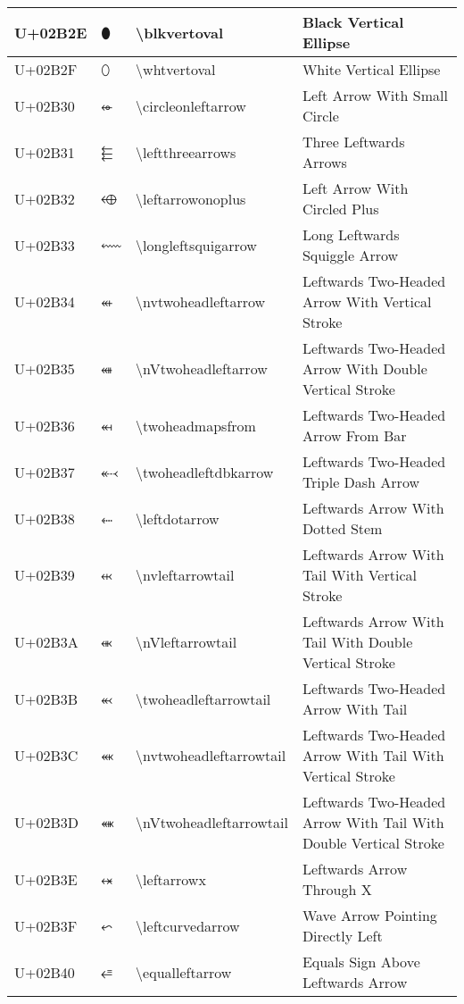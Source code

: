 \begin{table}[h]
\begin{tabulary}{\linewidth}{|L|L|L|L|}
\hline
U+02B2E & ⬮ & {\textbackslash}blkvertoval & Black Vertical Ellipse \\
\hline
U+02B2F & ⬯ & {\textbackslash}whtvertoval & White Vertical Ellipse \\
\hline
U+02B30 & ⬰ & {\textbackslash}circleonleftarrow & Left Arrow With Small Circle \\
\hline
U+02B31 & ⬱ & {\textbackslash}leftthreearrows & Three Leftwards Arrows \\
\hline
U+02B32 & ⬲ & {\textbackslash}leftarrowonoplus & Left Arrow With Circled Plus \\
\hline
U+02B33 & ⬳ & {\textbackslash}longleftsquigarrow & Long Leftwards Squiggle Arrow \\
\hline
U+02B34 & ⬴ & {\textbackslash}nvtwoheadleftarrow & Leftwards Two-Headed Arrow With Vertical Stroke \\
\hline
U+02B35 & ⬵ & {\textbackslash}nVtwoheadleftarrow & Leftwards Two-Headed Arrow With Double Vertical Stroke \\
\hline
U+02B36 & ⬶ & {\textbackslash}twoheadmapsfrom & Leftwards Two-Headed Arrow From Bar \\
\hline
U+02B37 & ⬷ & {\textbackslash}twoheadleftdbkarrow & Leftwards Two-Headed Triple Dash Arrow \\
\hline
U+02B38 & ⬸ & {\textbackslash}leftdotarrow & Leftwards Arrow With Dotted Stem \\
\hline
U+02B39 & ⬹ & {\textbackslash}nvleftarrowtail & Leftwards Arrow With Tail With Vertical Stroke \\
\hline
U+02B3A & ⬺ & {\textbackslash}nVleftarrowtail & Leftwards Arrow With Tail With Double Vertical Stroke \\
\hline
U+02B3B & ⬻ & {\textbackslash}twoheadleftarrowtail & Leftwards Two-Headed Arrow With Tail \\
\hline
U+02B3C & ⬼ & {\textbackslash}nvtwoheadleftarrowtail & Leftwards Two-Headed Arrow With Tail With Vertical Stroke \\
\hline
U+02B3D & ⬽ & {\textbackslash}nVtwoheadleftarrowtail & Leftwards Two-Headed Arrow With Tail With Double Vertical Stroke \\
\hline
U+02B3E & ⬾ & {\textbackslash}leftarrowx & Leftwards Arrow Through X \\
\hline
U+02B3F & ⬿ & {\textbackslash}leftcurvedarrow & Wave Arrow Pointing Directly Left \\
\hline
U+02B40 & ⭀ & {\textbackslash}equalleftarrow & Equals Sign Above Leftwards Arrow \\

\end{tabulary}
\end{table}
